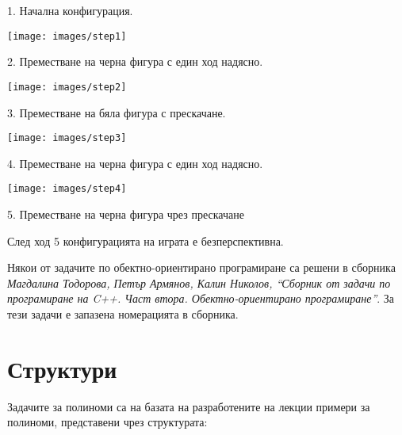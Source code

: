 {\begin{enumerate}[resume]
\begin{mdframed}[hidealllines=true,backgroundcolor=gray!20]
\begin{flushleft}
		1. Начална конфигурация.
		\end{flushleft}


		\begin{flushleft}
		\texttt{[image: images/step1]}

		2. Преместване на черна фигура с един ход надясно.
		\end{flushleft}

		\begin{flushleft}
		\texttt{[image: images/step2]}

		\relscale{0.8}
		3. Преместване на бяла фигура с прескачане.
		\end{flushleft}

		\begin{flushleft}
		\texttt{[image: images/step3]}

		4. Преместване на черна фигура с един ход надясно.
		\end{flushleft}

		\begin{flushleft}
		\texttt{[image: images/step4]}

		\relscale{0.8}
		5. Преместване на черна фигура чрез прескачане
		\end{flushleft}

		След ход 5 конфигурацията на играта е безперспективна.

	\end{mdframed}

\end{enumerate}

\pagebreak

\small{Някои от задачите по обектно-ориентирано програмиране са решени в сборника \cite{sbornik2}\textit{Магдалина Тодорова, Петър Армянов, Калин Николов, ``Сборник от задачи по програмиране на C++. Част втора. Обектно-ориентирано програмиране''}. За тези задачи е запазена номерацията в сборника.}

\pagebreak

\clearpage\section{Структури}

\begin{mdframed}[hidealllines=true,backgroundcolor=gray!20]
Задачите за полиноми са на базата на разработените на лекции примери за полиноми, представени чрез структурата:


\end{mdframed}}
